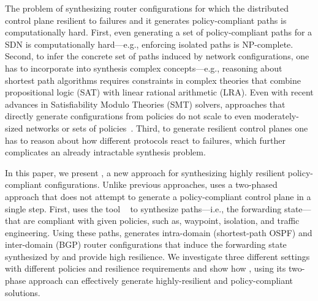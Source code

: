 The problem of synthesizing router configurations
for which the distributed control plane 
resilient to failures and it
generates policy-compliant paths 
is computationally hard. 
First, even generating a set of policy-compliant 
paths for a SDN  is 
computationally hard---e.g., enforcing isolated
paths is NP-complete. 
Second, to infer the concrete
set of paths induced by network configurations, 
one has to incorporate
into synthesis
complex concepts---e.g., reasoning about shortest path algorithms
requires constraints in complex
theories that combine propositional logic (SAT) 
with linear rational
arithmetic (LRA). Even with recent 
advances in Satisfiability Modulo Theories
(SMT) solvers, 
approaches that directly generate configurations  from policies
do not scale to
even moderately-sized networks or 
sets of policies~\cite{synet}.
Third, to generate resilient control planes one has to reason
about how different protocols react to failures, 
which further complicates an already intractable synthesis
problem. 


In this paper, we present \name, a new approach for synthesizing
highly resilient policy-compliant configurations.
Unlike previous approaches, \name uses a two-phased approach
that does not attempt to generate 
a policy-compliant control plane in a single step.
First, \name 
uses the tool \genesis~\cite{genesis}
to synthesize paths---i.e., the forwarding state---that are compliant
with given policies, such as, waypoint, isolation,
and traffic engineering.
Using these paths, \name generates 
intra-domain (shortest-path OSPF) and inter-domain (BGP) router configurations
that induce the forwarding
state synthesized by \genesis and provide high resilience. 
We investigate three different settings with different policies and resilience requirements
and show how \genesis, using its two-phase approach can effectively generate
highly-resilient and policy-compliant solutions.


